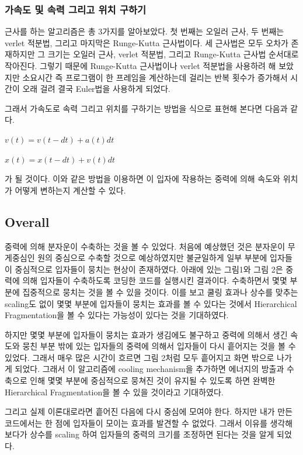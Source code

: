 \documentclass{gshs-hutech}
\begin{document}
\subsubsection{가속도 및 속력 그리고 위치 구하기}

근사를 하는 알고리즘은 총 3가지를 알아보았다. 첫 번째는 오일러 근사, 두 번째는 verlet 적분법, 그리고 마지막은 Runge-Kutta 근사법이다. 세 근사법은 모두 오차가 존재하지만 그 크기는 오일러 근사, verlet 적분법, 그리고 Runge-Kutta 근사법 순서대로 작아진다. 그렇기 때문에 Runge-Kutta 근사법이나 verlet 적분법을 사용하려 해 보았지만 소요시간 즉 프로그램이 한 프레임을 계산하는데 걸리는 반복 횟수가 증가해서 시간이 오래 걸려 결국 Euler법을 사용하게 되었다. 

그래서 가속도로 속력 그리고 위치를 구하기는 방법을 식으로 표현해 본다면 다음과 같다.

$v(t)=v(t-dt)+a(t)dt$

$x(t)=x(t-dt)+v(t)dt$

가 될 것이다. 이와 같은 방법을 이용하면 이 입자에 작용하는 중력에 의해 속도와 위치가 어떻게 변하는지 계산할 수 있다. 

\subsection{Overall} \label{gravitation_overall}

중력에 의해 분자운이 수축하는 것을 볼 수 있었다. 처음에 예상했던 것은 분자운이 무게중심인 원의 중심으로 수축할 것으로 예상하였지만 불균일하게 일부 부분에 입자들이 중심적으로 입자들이 뭉치는 현상이 존재하였다. 아래에 있는 그림1와 그림 2은 중력에 의해 입자들이 수축하도록 코딩한 코드를 실행시킨 결과이다. 수축하면서 몇몇 부분에 집중적으로 뭉치는 것을 볼 수 있을 것이다. 이를 보고 쿨링 효과나 상수를 맞추는 scaling도 없이 몇몇 부분에 입자들이 뭉치는 효과를 볼 수 있다는 것에서 Hierarchical Fragmentation을 볼 수 있다는 가능성이 있다는 것을 기대하였다. 

하지만 몇몇 부분에 입자들이 뭉치는 효과가 생김에도 불구하고 중력에 의해서 생긴 속도와 뭉친 부분 밖에 있는 입자들의 중력에 의해서 입자들이 다시 흩어지는 것을 볼 수 있었다. 그래서 매우 많은 시간이 흐르면 그림 2처럼 모두 흩어지고 화면 밖으로 나가게 되었다. 그래서 이 알고리즘에 cooling mechanism을 추가하면 에너지의 방출과 수축으로 인해 몇몇 부분에 중심적으로 뭉쳐진 것이 유지될 수 있도록 하면 완벽한 Hierarchical Fragmentation을 볼 수 있을 것이라고 기대하였다. 

그리고 실제 이론대로라면 흩어진 다음에 다시 중심에 모여야 한다. 하지만 내가 만든 코드에서는 한 점에 입자들이 모이는 효과를 발견할 수 없었다. 그래서 이유를 생각해 보다가 상수를 scaling 하여 입자들의 중력의 크기를 조정하면 된다는 것을 알게 되었다.
\end{document}
